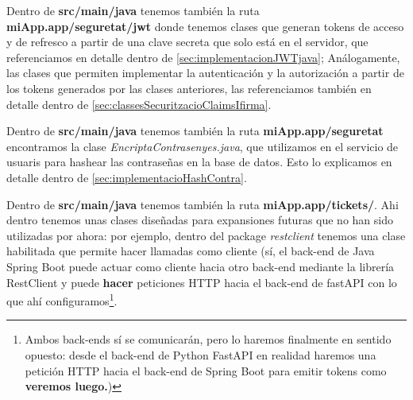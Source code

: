 \documentclass[a4paper,12pt]{report}
\begin{document}
				
				
				Dentro de \textbf{src/main/java} tenemos también la ruta \textbf{miApp.app/seguretat/jwt} donde tenemos clases que generan tokens de acceso y de refresco  a partir de una clave secreta que solo está en el servidor, que referenciamos en detalle dentro de \ref{sec:implementacionJWTjava}; Análogamente, las clases que permiten implementar la autenticación y la autorización a partir de los tokens generados por las clases anteriores, las referenciamos también en detalle dentro de \ref{sec:classesSecuritzacioClaimsIfirma}.
				
				Dentro de \textbf{src/main/java} tenemos también la ruta \textbf{miApp.app/seguretat} encontramos la clase \textit{EncriptaContrasenyes.java}, que utilizamos en el servicio de usuaris para hashear las contraseñas en la base de datos. Esto lo explicamos en detalle dentro de \ref{sec:implementacioHashContra}.
				
				Dentro de \textbf{src/main/java} tenemos también la ruta \textbf{miApp.app/tickets/}. Ahi dentro tenemos unas clases diseñadas para expansiones futuras que no han sido utilizadas por ahora: por ejemplo, dentro del package \textit{restclient} tenemos una clase habilitada que permite hacer llamadas como cliente (sí, el back-end de Java Spring Boot puede actuar como cliente hacia otro back-end mediante la librería RestClient y puede \textbf{hacer} peticiones HTTP hacia el back-end de fastAPI con lo que ahí configuramos\footnote{Ambos back-ends sí se comunicarán, pero lo haremos finalmente en sentido opuesto: desde el back-end de Python FastAPI en realidad haremos una petición HTTP hacia el back-end de Spring Boot para emitir tokens como \textbf{veremos luego.})}. 
				
\end{document}

